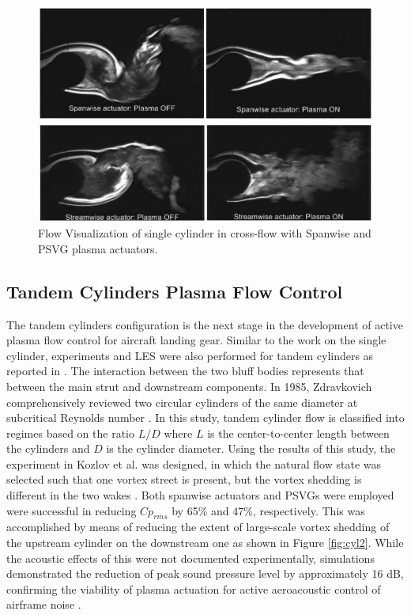 \begin{figure}
	\begin{center}
		\centerline{\includegraphics[scale=1.0]{figures/single_span.pdf}}
		\centerline{\includegraphics[scale=1.0]{figures/single_psvg.pdf}}
		\caption{Flow Visualization of single cylinder in cross-flow with Spanwise and PSVG plasma actuators.}
		\label{fig:cyl1}
	\end{center}
\end{figure}


\subsection{Tandem Cylinders Plasma Flow Control}

The tandem cylinders configuration is the next stage in the development of active plasma flow control for aircraft landing gear. Similar to the work on the single cylinder, experiments and LES were also performed for tandem cylinders as reported in \cite{khorrami2005} \cite{eltaweel2014} \cite{kozlov20112}. The interaction between the two bluff bodies represents that between the main strut and downstream components. In 1985, Zdravkovich comprehensively reviewed two circular cylinders of the same diameter at subcritical Reynolds number \cite{zdravkovich1985}. In this study, tandem cylinder flow is classified into regimes based on the ratio $L/D$ where $L$ is the center-to-center length between the cylinders and $D$ is the cylinder diameter. Using the results of this study, the experiment in Kozlov et al. was designed, in which the natural flow state was selected such that one vortex street is present, but the vortex shedding is different in the two wakes \cite{kozlov20112}. Both spanwise actuators and PSVGs were employed were successful in reducing $Cp_{rms}$ by 65\% and 47\%, respectively. This was accomplished by means of reducing the extent of large-scale vortex shedding of the upstream cylinder on the downstream one as shown in Figure \ref{fig:cyl2}. While the acoustic effects of this were not documented experimentally, simulations demonstrated the reduction of peak sound pressure level by approximately 16 dB, confirming the viability of plasma actuation for active aeroacoustic control of airframe noise \cite{eltaweel2014}.

